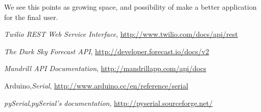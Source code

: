 \documentclass[12pt]{report}
\begin{document}
We see this points as growing space, and possibility of make a better application for the final user.

\renewcommand\bibname{Bibliography}
\begin{thebibliography}{}

  \emph{Twilio REST Web Service Interface},
  \url{http://www.twilio.com/docs/api/rest}
  
  \emph{The Dark Sky Forecast API},
  \url{http://developer.forecast.io/docs/v2}
  
  \emph{Mandrill API Documentation},
  \url{http://mandrillapp.com/api/docs}
  
  Arduino,\emph{Serial},
  \url{http://www.arduino.cc/en/reference/serial}
  
  \textit{pySerial},\emph{pySerial’s documentation},
  \url{http://pyserial.sourceforge.net/}
\end{thebibliography}

\newpage
\end{document}
